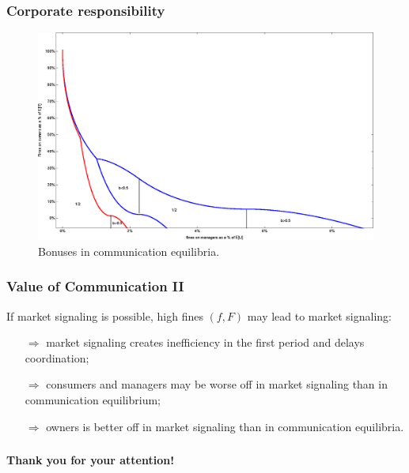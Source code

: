 \documentclass[xcolor=dvipsnames]{beamer}
\begin{document}
\begin{frame}
\frametitle{Corporate responsibility}
\begin{figure}[!]
\centering
\includegraphics[scale=0.7]{Plots/bonuses_gen.eps}
\caption{Bonuses in communication equilibria.}\label{fig:cs}
\end{figure}
\end{frame}

\begin{frame}
	\frametitle{Value of Communication II}
	If market signaling is possible, high fines $(f,F)$ may lead to market signaling:
	\begin{itemize}
		\item[$\Rightarrow$] market signaling creates inefficiency in the first period and delays coordination;
		
		\item[$\Rightarrow$] consumers and managers may be worse off in market signaling than in communication equilibrium;

		\item[$\Rightarrow$] owners is better off in market signaling than in communication equilibria.
	\end{itemize}
\end{frame}

\begin{frame}%
\frametitle{}
	\bigskip
	\begin{center}
		{ \textbf{Thank you for your attention!} }
	\end{center}
\end{frame}

\end{document}
